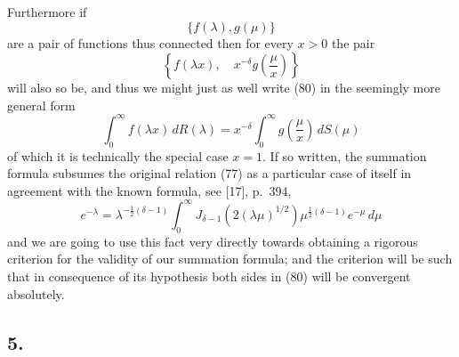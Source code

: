 \documentclass[12pt]{article}
\begin{document}
Furthermore if
\[
\{f(\lambda), g(\mu)\}
\]
are a pair of functions thus connected then for every \(x > 0\) the pair
\[
\left\{ f(\lambda x), \quad x^{-\delta} g\left( \frac{\mu}{x} \right) \right\}
\]
will also so be, and thus we might just as well write (80) in the seemingly more general form
\begin{equation}
\int_0^{\infty} f(\lambda x) \, dR(\lambda) = x^{-\delta} \int_0^{\infty} g\left( \frac{\mu}{x} \right) \, dS(\mu)
\tag{83}
\end{equation}
of which it is technically the special case \(x = 1\). If so written, the summation formula subsumes the original relation (77) as a particular case of itself in agreement with the known formula, see [17], p.~394,
\begin{equation}
e^{-\lambda} = \lambda^{-\frac{1}{2}(\delta-1)} \int_0^{\infty} J_{\delta-1}(2(\lambda\mu)^{1/2}) \mu^{\frac{1}{2}(\delta-1)} e^{-\mu} \, d\mu
\tag{84}
\end{equation}
and we are going to use this fact very directly towards obtaining a rigorous criterion for the validity of our summation formula; and the criterion will be such that in consequence of its hypothesis both sides in (80) will be convergent absolutely.

\subsection*{5.}
\end{document}
